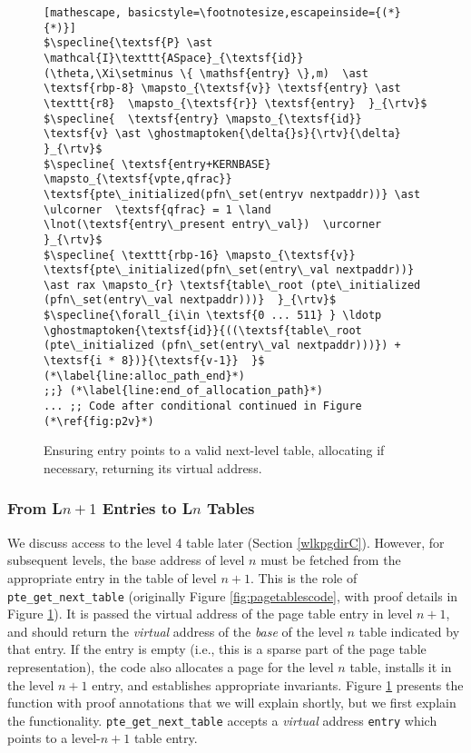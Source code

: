 \begin{figure}
\begin{lstlisting}[mathescape, basicstyle=\footnotesize,escapeinside={(*}{*)}]
$\specline{\textsf{P} \ast \mathcal{I}\texttt{ASpace}_{\textsf{id}}(\theta,\Xi\setminus \{ \mathsf{entry} \},m)  \ast \textsf{rbp-8} \mapsto_{\textsf{v}} \textsf{entry} \ast \texttt{r8}  \mapsto_{\textsf{r}} \textsf{entry}  }_{\rtv}$
$\specline{  \textsf{entry} \mapsto_{\textsf{id}} \textsf{v} \ast \ghostmaptoken{\delta{}s}{\rtv}{\delta} }_{\rtv}$
$\specline{ \textsf{entry+KERNBASE} \mapsto_{\textsf{vpte,qfrac}}  \textsf{pte\_initialized(pfn\_set(entryv nextpaddr))} \ast \ulcorner  \textsf{qfrac} = 1 \land \lnot(\textsf{entry\_present entry\_val})  \urcorner }_{\rtv}$
$\specline{ \texttt{rbp-16} \mapsto_{\textsf{v}} \textsf{pte\_initialized(pfn\_set(entry\_val nextpaddr))}  \ast rax \mapsto_{r} \textsf{table\_root (pte\_initialized (pfn\_set(entry\_val nextpaddr)))}  }_{\rtv}$
$\specline{\forall_{i\in \textsf{0 ... 511} } \ldotp  \ghostmaptoken{\textsf{id}}{((\textsf{table\_root (pte\_initialized (pfn\_set(entry\_val nextpaddr)))}) + \textsf{i * 8})}{\textsf{v-1}}  }$ (*\label{line:alloc_path_end}*)
;;} (*\label{line:end_of_allocation_path}*)
... ;; Code after conditional continued in Figure (*\ref{fig:p2v}*)
\end{lstlisting}
\fi
\vspace{-1em}
\caption{Ensuring \textsf{entry} points to a valid next-level table, allocating if necessary, returning its virtual address.}
\label{fig:calltopteinitializeC}
\vspace{-1em}
\end{figure}

\subsubsection{From L$n+1$ Entries to L$n$ Tables}
We discuss access to the level 4 table later (Section \ref{wlkpgdirC}). However, for subsequent levels, the base address of level $n$ must be
fetched from the appropriate entry in the table of level $n+1$.
This is the role of \lstinline|pte_get_next_table| (originally Figure \ref{fig:pagetablescode}, with proof details in Figure \ref{fig:calltopteinitializeC}).
It is passed the virtual address of the page table entry in level $n+1$, and should return the \emph{virtual} 
address of the \emph{base} of the level $n$ table
indicated by that entry.
If the entry is empty (i.e., this is a sparse part of the page table representation),
the code also allocates a page for the level $n$ table, installs it in the level $n+1$ entry, and establishes appropriate invariants.
Figure \ref{fig:calltopteinitializeC} presents the function with proof annotations that we will explain shortly, but we first explain the functionality.
\lstinline|pte_get_next_table| accepts a \emph{virtual} address \lstinline|entry| which points to a level-$n+1$
table entry.

